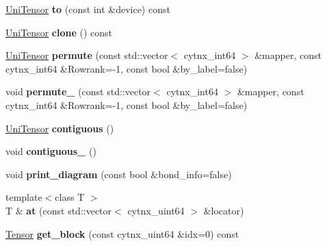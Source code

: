 \begin{DoxyCompactItemize}
\hyperlink{classcytnx_1_1UniTensor}{Uni\+Tensor} {\bfseries to} (const int \&device) const
\item 
\mbox{\label{classcytnx_1_1UniTensor_ae1125e6627eb2f5268d5c21944d31434}} 
\hyperlink{classcytnx_1_1UniTensor}{Uni\+Tensor} {\bfseries clone} () const
\item 
\mbox{\label{classcytnx_1_1UniTensor_a77ab3a44a6bfb1ab80de3d186b626d62}} 
\hyperlink{classcytnx_1_1UniTensor}{Uni\+Tensor} {\bfseries permute} (const std\+::vector$<$ cytnx\+\_\+int64 $>$ \&mapper, const cytnx\+\_\+int64 \&Rowrank=-\/1, const bool \&by\+\_\+label=false)
\item 
\mbox{\label{classcytnx_1_1UniTensor_a9fc950c25515e43fd2c6deecc1e66a99}} 
void {\bfseries permute\+\_\+} (const std\+::vector$<$ cytnx\+\_\+int64 $>$ \&mapper, const cytnx\+\_\+int64 \&Rowrank=-\/1, const bool \&by\+\_\+label=false)
\item 
\mbox{\label{classcytnx_1_1UniTensor_a450c62c231335103f723b96d0c08d18f}} 
\hyperlink{classcytnx_1_1UniTensor}{Uni\+Tensor} {\bfseries contiguous} ()
\item 
\mbox{\label{classcytnx_1_1UniTensor_a80a6e52a909c02c577ebeeb815f93ebf}} 
void {\bfseries contiguous\+\_\+} ()
\item 
\mbox{\label{classcytnx_1_1UniTensor_a685061555097873eb172381059fda92b}} 
void {\bfseries print\+\_\+diagram} (const bool \&bond\+\_\+info=false)
\item 
\mbox{\label{classcytnx_1_1UniTensor_a432b37f45cd8a87ceefd45eb2d8e6330}} 
{\footnotesize template$<$class T $>$ }\\T \& {\bfseries at} (const std\+::vector$<$ cytnx\+\_\+uint64 $>$ \&locator)
\item 
\mbox{\label{classcytnx_1_1UniTensor_a7d4df6dffeca0fd8eafdb9d766813f84}} 
\hyperlink{classcytnx_1_1Tensor}{Tensor} {\bfseries get\+\_\+block} (const cytnx\+\_\+uint64 \&idx=0) const
\item 
\mbox{\label{classcytnx_1_1UniTensor_a9d08b8f666a998f435ccc2ac96e6c7e5}} 

\end{DoxyCompactItemize}
